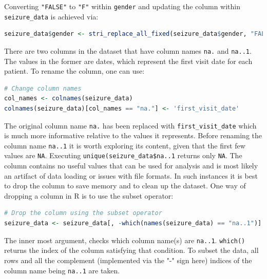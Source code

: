 Converting \verb|"FALSE"| to \verb|"F"| within \verb|gender| and updating the column within \verb|seizure_data| is achieved via:
\begin{lstlisting}[language=R]
seizure_data$gender <- stri_replace_all_fixed(seizure_data$gender, "FALSE", "F")
\end{lstlisting}

There are two columns in the dataset that have column names \verb|na.| and \verb|na..1|. The values in the former are dates, which represent the first visit date for each patient. To rename the column, one can use:
\begin{lstlisting}[language=R]
# Change column names
col_names <- colnames(seizure_data)
colnames(seizure_data)[col_names == "na."] <- 'first_visit_date'
\end{lstlisting}
The original column name \verb|na.| has been replaced with \verb|first_visit_date| which is much more informative relative to the values it represents.
Before renaming the column name \verb|na..1| it is worth exploring its content, given that the first few values are \verb|NA|. Executing \verb|unique(seizure_data$na..1| returns only \verb|NA|. The column contains no useful values that can be used for analysis and is most likely an artifact of data loading or issues with file formats. In such instances it is best to drop the column to save memory and to clean up the dataset. One way of dropping a column in R is to use the subset operator:
\begin{lstlisting}[language=R]
# Drop the column using the subset operator
seizure_data <- seizure_data[, -which(names(seizure_data) == "na..1")]
\end{lstlisting}
The inner most argument, checks which column name(s) are \verb|na..1|. \verb|which()| returns the index of the column satisfying that condition. To subset the data, all rows and all the complement (implemented via the "-" sign here) indices of the column name being \verb|na..1| are taken.

